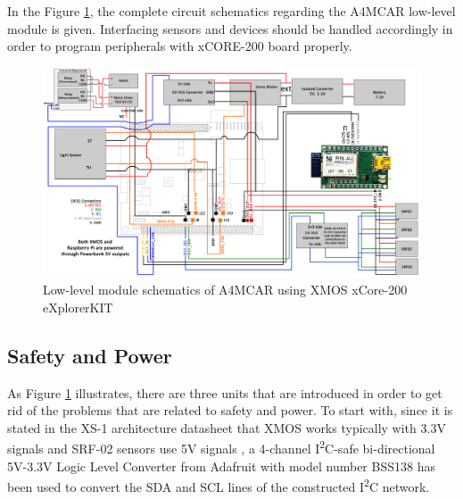 In the Figure \ref{fig:RCCAR_Schematics}, the complete circuit schematics regarding the A4MCAR low-level module is given. Interfacing sensors and devices should be handled accordingly in order to program peripherals with xCORE-200 board properly. 
\begin{figure}[!ht]
	\centering
	\captionsetup{justification=centering}
	\includegraphics[width=\textwidth]{content/images/RCCAR_Schematics.png}
	\caption{Low-level module schematics of A4MCAR using XMOS xCore-200 eXplorerKIT}
	\label{fig:RCCAR_Schematics}
\end{figure}
\subsection{Safety and Power}
As Figure \ref{fig:RCCAR_Schematics} illustrates, there are three units that are introduced in order to get rid of the problems that are related to safety and power. To start with, since it is stated in the XS-1 architecture datasheet \cite{xmosdatasheet} that XMOS works typically with 3.3V signals and SRF-02 sensors use 5V signals \cite{srf02datasheet}, a 4-channel I\textsuperscript{2}C-safe bi-directional 5V-3.3V Logic Level Converter from Adafruit with model number BSS138 \cite{adafruitlevelconverter} has been used to convert the SDA and SCL lines of the constructed I\textsuperscript{2}C network. 

